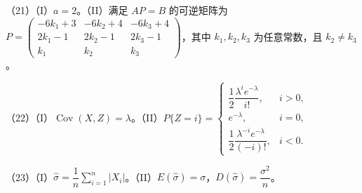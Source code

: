 \documentclass[UTF8,12pt]{ctexart}
\begin{document}
（21）（I）\(\displaystyle a=2\)。（II）满足 \(\displaystyle AP=B\) 的可逆矩阵为 \(\displaystyle P=\begin{pmatrix}-6k_1+3&-6k_2+4&-6k_3+4\\2k_1-1&2k_2-1&2k_3-1\\k_1&k_2&k_3\end{pmatrix}\)，其中 \(\displaystyle k_1,\allowbreak k_2,\allowbreak k_3\) 为任意常数，且 \(\displaystyle k_2\ne k_3\)。


（22）（I）\(\displaystyle \operatorname{Cov}(X,\allowbreak Z)=\lambda\)。（II）\(\displaystyle P\{Z=i\}=\begin{cases}\dfrac{\displaystyle 1}{\displaystyle 2}\dfrac{\displaystyle \lambda^i e^{-\lambda}}{\displaystyle i!},\allowbreak &i>0,\allowbreak \\e^{-\lambda},\allowbreak &i=0,\allowbreak \\\dfrac{\displaystyle 1}{\displaystyle 2}\dfrac{\displaystyle \lambda^{-i}e^{-\lambda}}{\displaystyle (-i)!},\allowbreak &i<0.\end{cases}\)


（23）（I）\(\displaystyle \hat\sigma=\dfrac{\displaystyle 1}{\displaystyle n}\displaystyle \sum_{i=1}^n|X_i|\)。（II）\(\displaystyle E(\hat\sigma)=\sigma\)，\(\displaystyle D(\hat\sigma)=\dfrac{\displaystyle \sigma^2}{\displaystyle n}\)。


\clearpage
\end{document}
